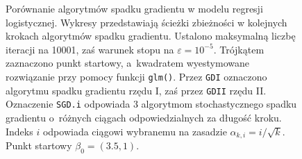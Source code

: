 \begin{figure}[hbt!]
  \caption[Porównanie algorytmów spadku gradientu dla punktu startowego $\beta_0 = (3.5,1)$.]{\label{fig:sc3asd}Porównanie algorytmów spadku gradientu w modelu regresji logistycznej. Wykresy przedstawiają ścieżki zbieżności w kolejnych krokach algorytmów spadku gradientu. Ustalono maksymalną liczbę iteracji na 10001, zaś warunek stopu na $\varepsilon=10^{-5}$. Trójkątem zaznaczono punkt startowy, a~kwadratem wyestymowane rozwiązanie przy pomocy funkcji \texttt{glm()}. Przez \texttt{GDI} oznaczono algorytmu spadku gradientu rzędu I, zaś przez \texttt{GDII} rzędu II. Oznaczenie \texttt{SGD.i} odpowiada 3 algorytmom stochastycznego spadku gradientu o~różnych ciągach odpowiedzialnych za długość kroku. Indeks $i$ odpowiada ciągowi wybranemu na zasadzie $\alpha_{k,i} = i/\sqrt{k}$. Punkt startowy $\beta_0 = (3.5,1)$.}
\end{figure}


